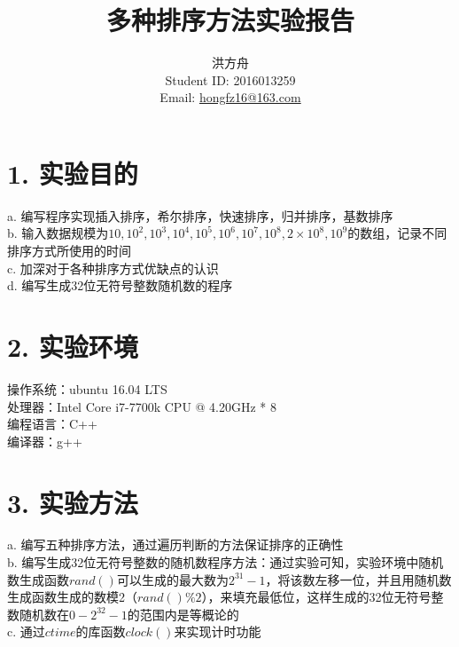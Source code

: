 \documentclass[12pt]{article}
\title{多种排序方法实验报告}
\author{洪方舟\\Student ID: 2016013259\\Email: \href{mailto:hongfz16@163.com}{hongfz16@163.com}}
\begin{document}
  \maketitle
  \section*{1. 实验目的}
  a. 编写程序实现插入排序，希尔排序，快速排序，归并排序，基数排序\\
  b. 输入数据规模为$10,10^2,10^3,10^4,10^5,10^6,10^7,10^8,2\times10^8,10^9$的数组，记录不同排序方式所使用的时间\\
  c. 加深对于各种排序方式优缺点的认识\\
  d. 编写生成32位无符号整数随机数的程序
  \section*{2. 实验环境}
  操作系统：ubuntu 16.04 LTS\\
  处理器：Intel Core i7-7700k CPU @ 4.20GHz * 8\\
  编程语言：C++\\
  编译器：g++
  \section*{3. 实验方法}
  a. 编写五种排序方法，通过遍历判断的方法保证排序的正确性\\
  b. 编写生成32位无符号整数的随机数程序方法：通过实验可知，实验环境中随机数生成函数$rand()$可以生成的最大数为$2^31-1$，将该数左移一位，并且用随机数生成函数生成的数模2（$rand()\%2$），来填充最低位，这样生成的32位无符号整数随机数在$0-2^32-1$的范围内是等概论的\\
  c. 通过$ctime$的库函数$clock()$来实现计时功能
\end{document}
